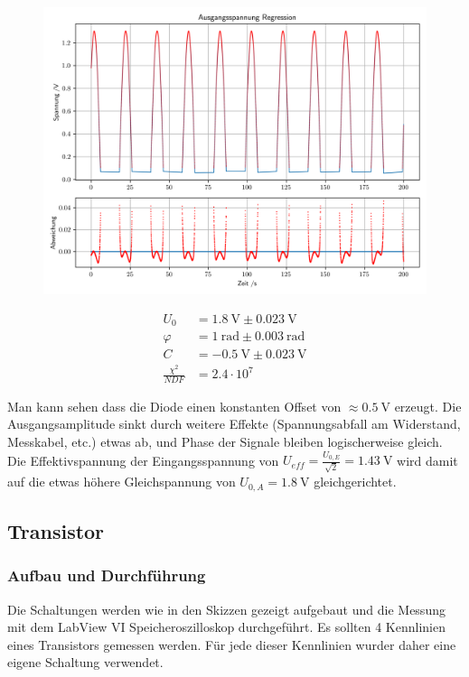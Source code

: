 \documentclass[12pt,twoside,a4paper]{scrartcl}
\begin{document}
			\begin{figure}[H]
				\begin{minipage}{0.69 \textwidth}
					\includegraphics[width = \textwidth]{Plots/rectifier/ausgang}
				\end{minipage}
				\begin{minipage}{0.29 \textwidth}
					\begin{align*}
						U_0 &= \SI{1.8}{\volt} \pm \SI{0.023}{\volt} \\
						\varphi &= \SI{1}{\radian} \pm \SI{0.003}{\radian} \\
						C &= \SI{-0.5}{ \volt } \pm \SI{0.023}{\volt} \\
						\frac{\chi^2}{NDF} &= 2.4 \cdot 10^7
					\end{align*}
				\end{minipage}
			\end{figure}

			Man kann sehen dass die Diode einen konstanten Offset von $\approx \SI{0.5}{\volt}$ erzeugt. Die Ausgangsamplitude sinkt durch weitere Effekte (Spannungsabfall am Widerstand, Messkabel, etc.) etwas ab, und Phase der Signale bleiben logischerweise gleich. Die Effektivspannung der Eingangsspannung von $U_{eff} = \frac{U_{0,E}}{\sqrt{2}} = \SI{1.43}{\volt}$ wird damit auf die etwas höhere Gleichspannung von $  U_{0,A} = \SI{1.8}{\volt}$ gleichgerichtet.


	\subsection{Transistor}
		\subsubsection{Aufbau und Durchführung}
			Die Schaltungen werden wie in den Skizzen gezeigt aufgebaut und die Messung mit dem LabView VI Speicheroszilloskop durchgeführt.
      Es sollten 4 Kennlinien eines Transistors gemessen werden. Für jede dieser Kennlinien wurder daher eine eigene Schaltung verwendet.
\end{document}
